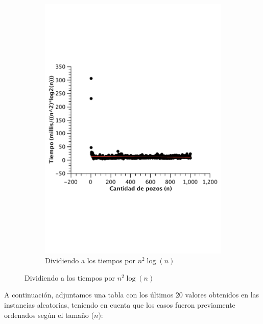 \begin{figure}[H]
        \centering

        \begin{subfigure}[b]{0.5\textwidth}
                \includegraphics[width=\textwidth]{imagenes/ej3-const.pdf}
                \caption*{Dividiendo a los tiempos por $n^2 \log(n)$}
        \end{subfigure}

\end{figure}


A continuación, adjuntamos una tabla con los últimos 20 valores obtenidos en las instancias aleatorias, teniendo en cuenta que los casos fueron previamente ordenados según el tamaño ($n$):

